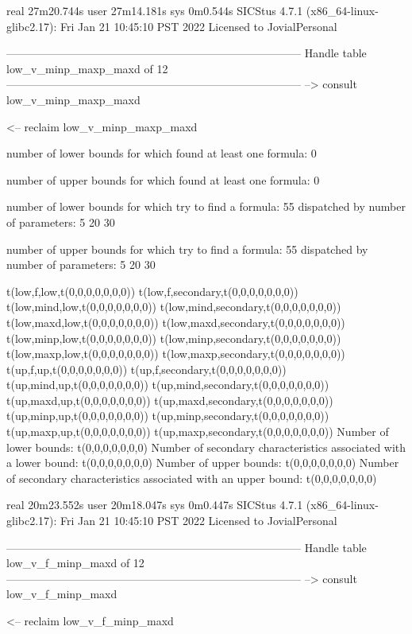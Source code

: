 real	27m20.744s
user	27m14.181s
sys	0m0.544s
SICStus 4.7.1 (x86_64-linux-glibc2.17): Fri Jan 21 10:45:10 PST 2022
Licensed to JovialPersonal


--------------------------------------------------------------------------------
Handle table low_v_minp_maxp_maxd of 12
--------------------------------------------------------------------------------
--> consult low_v_minp_maxp_maxd

<-- reclaim low_v_minp_maxp_maxd

number of lower bounds for which found at least one formula: 0

number of upper bounds for which found at least one formula: 0

number of lower bounds for which try to find a formula: 55
dispatched by number of parameters: 5  20  30

number of upper bounds for which try to find a formula: 55
dispatched by number of parameters: 5  20  30

t(low,f,low,t(0,0,0,0,0,0,0))
t(low,f,secondary,t(0,0,0,0,0,0,0))
t(low,mind,low,t(0,0,0,0,0,0,0))
t(low,mind,secondary,t(0,0,0,0,0,0,0))
t(low,maxd,low,t(0,0,0,0,0,0,0))
t(low,maxd,secondary,t(0,0,0,0,0,0,0))
t(low,minp,low,t(0,0,0,0,0,0,0))
t(low,minp,secondary,t(0,0,0,0,0,0,0))
t(low,maxp,low,t(0,0,0,0,0,0,0))
t(low,maxp,secondary,t(0,0,0,0,0,0,0))
t(up,f,up,t(0,0,0,0,0,0,0))
t(up,f,secondary,t(0,0,0,0,0,0,0))
t(up,mind,up,t(0,0,0,0,0,0,0))
t(up,mind,secondary,t(0,0,0,0,0,0,0))
t(up,maxd,up,t(0,0,0,0,0,0,0))
t(up,maxd,secondary,t(0,0,0,0,0,0,0))
t(up,minp,up,t(0,0,0,0,0,0,0))
t(up,minp,secondary,t(0,0,0,0,0,0,0))
t(up,maxp,up,t(0,0,0,0,0,0,0))
t(up,maxp,secondary,t(0,0,0,0,0,0,0))
Number of lower bounds:                                             t(0,0,0,0,0,0,0)
Number of secondary characteristics associated with a lower bound:  t(0,0,0,0,0,0,0)
Number of upper bounds:                                             t(0,0,0,0,0,0,0)
Number of secondary characteristics associated with an upper bound: t(0,0,0,0,0,0,0)

real	20m23.552s
user	20m18.047s
sys	0m0.447s
SICStus 4.7.1 (x86_64-linux-glibc2.17): Fri Jan 21 10:45:10 PST 2022
Licensed to JovialPersonal


--------------------------------------------------------------------------------
Handle table low_v_f_minp_maxd of 12
--------------------------------------------------------------------------------
--> consult low_v_f_minp_maxd

<-- reclaim low_v_f_minp_maxd

